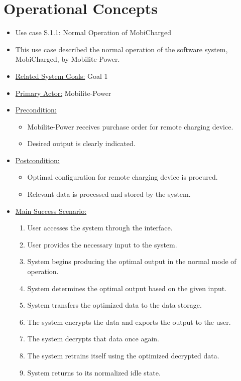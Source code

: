 \documentclass[12pt, titlepage]{article}
\begin{document}
\section{Operational Concepts}

\begin{itemize}
    \item Use case S.1.1: Normal Operation of MobiCharged
    \item This use case described the normal operation of the software system, MobiCharged, by Mobilite-Power.
    \item \underline{Related System Goals:} Goal 1
    \item \underline{Primary Actor:} Mobilite-Power
    \item \underline{Precondition:}
    \begin{itemize}
        \item Mobilite-Power receives purchase order for remote charging device.
        \item Desired output is clearly indicated.
    \end{itemize}
    \item \underline{Postcondition:}
    \begin{itemize}
        \item Optimal configuration for remote charging device is procured.
        \item Relevant data is processed and stored by the system.
    \end{itemize}
    \item \underline{Main Success Scenario:}
    \begin{enumerate}
        \item User accesses the system through the interface.
        \item User provides the necessary input to the system.
        \item System begins producing the optimal output in the normal mode of operation.
        \item System determines the optimal output based on the given input.
        \item System transfers the optimized data to the data storage.
        \item The system encrypts the data and exports the output to the user.
        \item The system decrypts that data once again.
        \item The system retrains itself using the optimized decrypted data.
        \item System returns to its normalized idle state.
    \end{enumerate}
\end{itemize}
\end{document}
